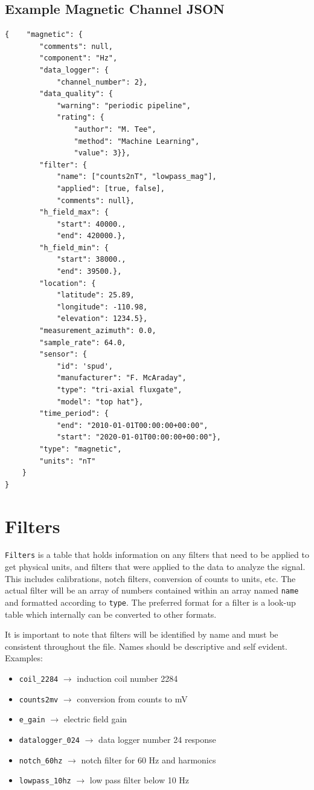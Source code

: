 \documentclass[12pt]{article}
\begin{document}
\newpage
\subsection{Example Magnetic Channel JSON}

\begin{verbatim}
{    "magnetic": {
        "comments": null,
        "component": "Hz",
        "data_logger": {
            "channel_number": 2},
        "data_quality": {
            "warning": "periodic pipeline",
            "rating": {
                "author": "M. Tee",
                "method": "Machine Learning",
                "value": 3}},
        "filter": {
            "name": ["counts2nT", "lowpass_mag"],
            "applied": [true, false],
            "comments": null},
        "h_field_max": {
            "start": 40000.,
            "end": 420000.},
        "h_field_min": {
            "start": 38000.,
            "end": 39500.},
        "location": {
            "latitude": 25.89,
            "longitude": -110.98,
            "elevation": 1234.5},
        "measurement_azimuth": 0.0,
        "sample_rate": 64.0,
        "sensor": {
            "id": 'spud',
            "manufacturer": "F. McAraday",
            "type": "tri-axial fluxgate",
            "model": "top hat"},
        "time_period": {
            "end": "2010-01-01T00:00:00+00:00",
            "start": "2020-01-01T00:00:00+00:00"},
        "type": "magnetic",
        "units": "nT"
    }
}
\end{verbatim}

\newpage
\section{Filters}

\verb|Filters| is a table that holds information on any filters that need to be applied to get physical units, and filters that were applied to the data to analyze the signal.  This includes calibrations, notch filters, conversion of counts to units, etc. The actual filter will be an array of numbers contained within an array named \verb|name| and formatted according to \verb|type|. The preferred format for a filter is a look-up table which internally can be converted to other formats. 

It is important to note that filters will be identified by name and must be consistent throughout the file. Names should be descriptive and self evident. Examples:
\begin{itemize}
    \item \verb|coil_2284| $\longrightarrow$ induction coil number 2284
    \item \verb|counts2mv| $\longrightarrow$ conversion from counts to mV
    \item \verb|e_gain| $\longrightarrow$ electric field gain 
    \item \verb|datalogger_024| $\longrightarrow$ data logger number 24 response
    \item \verb|notch_60hz| $\longrightarrow$ notch filter for 60 Hz and harmonics
    \item \verb|lowpass_10hz| $\longrightarrow$ low pass filter below 10 Hz
\end{itemize}
\end{document}
